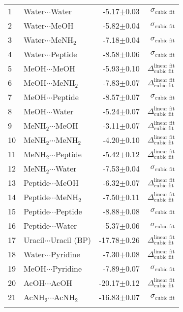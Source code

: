 \begin{longtable}{llrr}
1 & Water$\cdots$Water & -5.17$\pm$0.03 & $\sigma_\textrm{cubic fit}$ \\
2 & Water$\cdots$MeOH & -5.82$\pm$0.04 & $\sigma_\textrm{cubic fit}$ \\
3 & Water$\cdots$MeNH$_2$ & -7.18$\pm$0.04 & $\sigma_\textrm{cubic fit}$ \\
4 & Water$\cdots$Peptide & -8.58$\pm$0.06 & $\sigma_\textrm{cubic fit}$ \\
5 & MeOH$\cdots$MeOH & -5.93$\pm$0.10 & $\Delta_\textrm{cubic fit}^\textrm{linear fit}$ \\
6 & MeOH$\cdots$MeNH$_2$ & -7.83$\pm$0.07 & $\Delta_\textrm{cubic fit}^\textrm{linear fit}$ \\
7 & MeOH$\cdots$Peptide & -8.57$\pm$0.07 & $\sigma_\textrm{cubic fit}$ \\
8 & MeOH$\cdots$Water & -5.24$\pm$0.07 & $\Delta_\textrm{cubic fit}^\textrm{linear fit}$ \\
9 & MeNH$_2$$\cdots$MeOH & -3.11$\pm$0.07 & $\Delta_\textrm{cubic fit}^\textrm{linear fit}$ \\
10 & MeNH$_2$$\cdots$MeNH$_2$ & -4.20$\pm$0.10 & $\Delta_\textrm{cubic fit}^\textrm{linear fit}$ \\
11 & MeNH$_2$$\cdots$Peptide & -5.42$\pm$0.12 & $\Delta_\textrm{cubic fit}^\textrm{linear fit}$ \\
12 & MeNH$_2$$\cdots$Water & -7.53$\pm$0.04 & $\sigma_\textrm{cubic fit}$ \\
13 & Peptide$\cdots$MeOH & -6.32$\pm$0.07 & $\Delta_\textrm{cubic fit}^\textrm{linear fit}$ \\
14 & Peptide$\cdots$MeNH$_2$ & -7.50$\pm$0.11 & $\Delta_\textrm{cubic fit}^\textrm{linear fit}$ \\
15 & Peptide$\cdots$Peptide & -8.88$\pm$0.08 & $\sigma_\textrm{cubic fit}$ \\
16 & Peptide$\cdots$Water & -5.37$\pm$0.06 & $\sigma_\textrm{cubic fit}$ \\
17 & Uracil$\cdots$Uracil (BP) & -17.78$\pm$0.26 & $\Delta_\textrm{cubic fit}^\textrm{linear fit}$ \\
18 & Water$\cdots$Pyridine & -7.30$\pm$0.08 & $\Delta_\textrm{cubic fit}^\textrm{linear fit}$ \\
19 & MeOH$\cdots$Pyridine & -7.89$\pm$0.07 & $\sigma_\textrm{cubic fit}$ \\
20 & AcOH$\cdots$AcOH & -20.17$\pm$0.12 & $\Delta_\textrm{cubic fit}^\textrm{linear fit}$ \\
21 & AcNH$_2$$\cdots$AcNH$_2$ & -16.83$\pm$0.07 & $\sigma_\textrm{cubic fit}$ \\
$$
\end{longtable}
